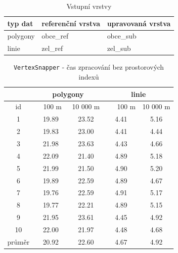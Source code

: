 \begin{table}[H]
 \centering
  \caption{Vstupní vrstvy}
\begin{tabular}{|l|l|l|}
\hline
 typ dat & referenční vrstva & upravovaná vrstva \\
\hline
\hline
 polygony & obce\_ref & obce\_sub \\
 linie & zel\_ref & zel\_sub \\
 \hline
\end{tabular}
  \label{tab:vstup}
\end{table}

\begin{table}[H]
 \centering
  \small
   \caption{\texttt{Vertex\-Snapper} -
	    čas zpracování bez prostorových indexů}
  \begin{tabular}{|c|c|c|c|c|}
   \hline
      & \multicolumn{2}{c|}{polygony} & 
 	\multicolumn{2}{c|}{linie} \\
   \hline
    id  &  ~~100 m~ & 10 000 m & ~~~100 m & 10 000 m\\
   \hline
   \hline
 1  & 19.89 & 23.52 & 4.41 & 5.16 \\ 
 2  & 19.83 & 23.00 & 4.41 & 4.44 \\
 3  & 21.98 & 23.63 & 4.43 & 4.66 \\
 4  & 22.09 & 21.40 & 4.89 & 5.18 \\
 5  & 21.99 & 21.50 & 4.90 & 5.20 \\
 6  & 19.89 & 22.59 & 4.89 & 4.67 \\
 7  & 19.76 & 22.59 & 4.91 & 5.17 \\
 8  & 19.77 & 22.21 & 4.89 & 5.15 \\
 9  & 21.95 & 23.61 & 4.45 & 4.92 \\
 10 & 22.00 & 21.97 & 4.48 & 4.68 \\
   \hline
   \hline
   průměr & 20.92 & 22.60 & 4.67 & 4.92 \\
   \hline
  \end{tabular}
   \label{tab:vs-bez}
\end{table}
 
